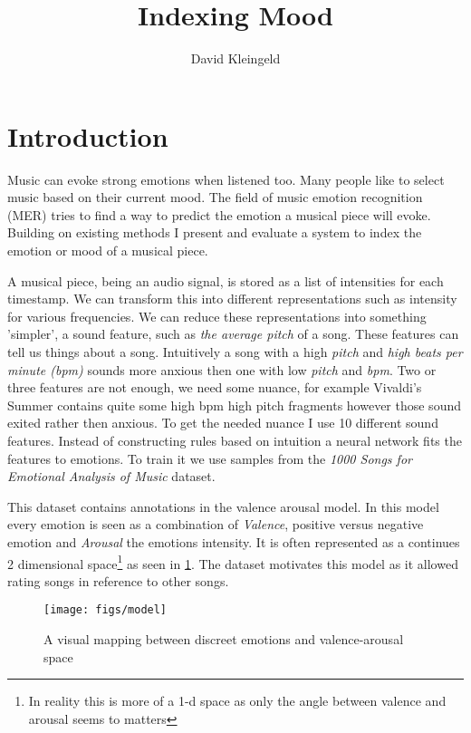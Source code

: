 \documentclass[lang=en, hanging-titles=true]{skrapport}
\title{Indexing Mood}
\author[dskleingeld@gmail.com]{David Kleingeld}
\begin{document}
\maketitle
\tableofcontents

\section{Introduction}
Music can evoke strong emotions when listened too. Many people like to select music based on their current mood. The field of music emotion recognition (MER) tries to find a way to predict the emotion a musical piece will evoke. Building on existing methods I present and evaluate a system to index the emotion or mood of a musical piece.

A musical piece, being an audio signal, is stored as a list of intensities for each timestamp. We can transform this into different representations such as intensity for various frequencies. We can reduce these representations into something 'simpler', a sound feature, such as \textit{the average pitch} of a song. These features can tell us things about a song. Intuitively a song with a high \textit{pitch} and \textit{high beats per minute (bpm)} sounds more anxious then one with low \textit{pitch} and \textit{bpm}. Two or three features are not enough, we need some nuance, for example Vivaldi's Summer contains quite some high bpm high pitch fragments however those sound exited rather then anxious. To get the needed nuance I use 10 different sound features. Instead of constructing rules based on intuition a neural network fits the features to emotions. To train it we use samples from the \textit{1000 Songs for Emotional Analysis of Music}\cite{dataset} dataset.

This dataset contains annotations in the valence arousal model. In this model every emotion is seen as a combination of \textit{Valence}, positive versus negative emotion and \textit{Arousal} the emotions intensity. It is often represented as a continues 2 dimensional space\footnote{In reality this is more of a 1-d space as only the angle between valence and arousal seems to matters} as seen in \cref{fig:model}. The dataset motivates this model as it allowed rating songs in reference to other songs.

\begin{figure}[htbp]
	\centering
	\texttt{[image: figs/model]}
	\caption{A visual mapping between discreet emotions and valence-arousal space}
	\label{fig:model}
\end{figure}
\end{document}
